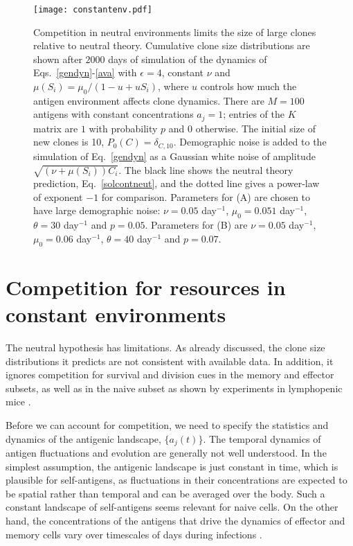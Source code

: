 \documentclass[aps,pre,twocolumn,superscriptaddress,groupedaddress]{revtex4}
\newcommand{\<}{\langle}
\renewcommand{\>}{\rangle}
\begin{document}
  \begin{figure}
\begin{center}
\texttt{[image: constantenv.pdf]}
    \caption{Competition in neutral environments limits the size of large clones relative to neutral theory. Cumulative clone size distributions are shown after $2000$ days of simulation of the dynamics of Eqs.~\ref{gendyn}-\ref{ava} with $\epsilon=4$, constant $\nu$  and $\mu(S_i)=\mu_0/(1-u+uS_i)$, where $u$ controls how much the antigen environment affects clone dynamics. There are $M=100$ antigens with constant concentrations $a_j=1$; entries of the $K$ matrix are $1$ with probability $p$ and $0$ otherwise. The initial size of new clones is 10, $P_0(C)=\delta_{C,10}$. Demographic noise is added to the simulation of Eq.~\ref{gendyn} as a Gaussian white noise of amplitude $\sqrt{(\nu+\mu(S_i))C_i}$. The black line shows the neutral theory prediction, Eq.~\ref{solcontneut}, and the dotted line gives a power-law of exponent $-1$ for comparison. Parameters for (A) are chosen to have large demographic noise: $\nu=0.05$ {\rm day}$^{-1}$, $\mu_0=0.051$ {\rm day}$^{-1}$, $\theta=30$ {\rm day}$^{-1}$ and $p = 0.05$. Parameters for (B) are $\nu=0.05$ {\rm day}$^{-1}$, $\mu_0=0.06$ {\rm day}$^{-1}$, $\theta=40$ {\rm day}$^{-1}$ and $p = 0.07$.}
\label{fig3}
\end{center}
\end{figure}

 \section{Competition for resources in constant environments}
 \label{cons}
 
The neutral hypothesis has limitations. As already discussed, the clone size distributions it predicts are not consistent with available data. In addition, it ignores competition for survival and division cues in the memory and effector subsets, as well as in the naive subset as shown by experiments in lymphopenic mice \cite{goldrath1999}. 
 
Before we can account for competition, we need to specify the statistics and dynamics of the antigenic landscape, $\{a_j(t)\}$. The temporal dynamics of antigen fluctuations and evolution are generally not well understood. In the simplest assumption, the antigenic landscape is just constant in time, which is plausible for self-antigens, as fluctuations in their concentrations are expected to be spatial rather than temporal and can be averaged over the body. Such a constant landscape of self-antigens seems relevant for naive cells.
On the other hand, the concentrations of the antigens that drive the dynamics of effector and memory cells vary over timescales of days during infections \cite{Fonville2014,Luksza2014,Nourmohammad2015}. 
\end{document}
